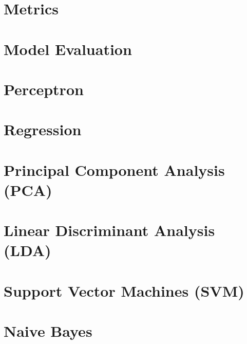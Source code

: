 \documentclass[a4paper]{book}
\begin{document}
\pagestyle{fancy}
\tableofcontents
\newpage
















\chapter{Metrics}
\framedtext{\color{red}{TODO:}}
\chapter{Model Evaluation}
\framedtext{\color{red}{TODO:}}
\chapter{Perceptron}
\framedtext{\color{red}{TODO:}}



\chapter{Regression}
\framedtext{\color{red}{TODO:}}
\chapter{Principal Component Analysis (PCA)}
\label{ch:pca}
\framedtext{\color{red}{TODO:}}

\chapter{Linear Discriminant Analysis (LDA)}
\label{ch:lda}
\framedtext{\color{red}{TODO:}}
\chapter{Support Vector Machines (SVM)}
\label{ch:svm}
\framedtext{\color{red}{TODO:}}
\chapter{Naive Bayes}
\label{ch:naive-bayes}
\framedtext{\color{red}{TODO:}}
\end{document}
